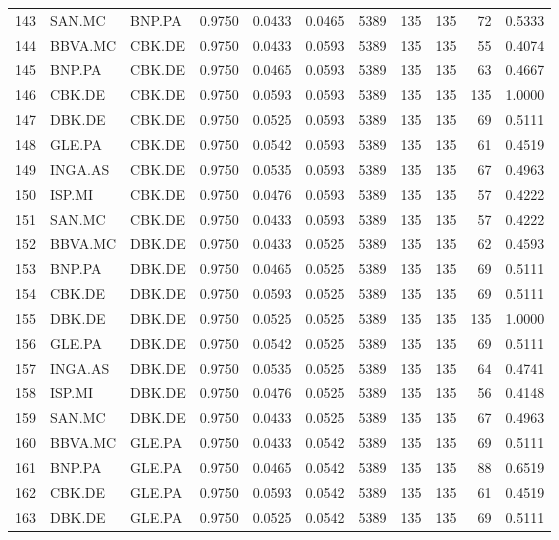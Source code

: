 \begin{table}
\begin{tabular}{lllrrrrrrrr}
143 & SAN.MC & BNP.PA & 0.9750 & 0.0433 & 0.0465 & 5389 & 135 & 135 & 72 & 0.5333 \\
144 & BBVA.MC & CBK.DE & 0.9750 & 0.0433 & 0.0593 & 5389 & 135 & 135 & 55 & 0.4074 \\
145 & BNP.PA & CBK.DE & 0.9750 & 0.0465 & 0.0593 & 5389 & 135 & 135 & 63 & 0.4667 \\
146 & CBK.DE & CBK.DE & 0.9750 & 0.0593 & 0.0593 & 5389 & 135 & 135 & 135 & 1.0000 \\
147 & DBK.DE & CBK.DE & 0.9750 & 0.0525 & 0.0593 & 5389 & 135 & 135 & 69 & 0.5111 \\
148 & GLE.PA & CBK.DE & 0.9750 & 0.0542 & 0.0593 & 5389 & 135 & 135 & 61 & 0.4519 \\
149 & INGA.AS & CBK.DE & 0.9750 & 0.0535 & 0.0593 & 5389 & 135 & 135 & 67 & 0.4963 \\
150 & ISP.MI & CBK.DE & 0.9750 & 0.0476 & 0.0593 & 5389 & 135 & 135 & 57 & 0.4222 \\
151 & SAN.MC & CBK.DE & 0.9750 & 0.0433 & 0.0593 & 5389 & 135 & 135 & 57 & 0.4222 \\
152 & BBVA.MC & DBK.DE & 0.9750 & 0.0433 & 0.0525 & 5389 & 135 & 135 & 62 & 0.4593 \\
153 & BNP.PA & DBK.DE & 0.9750 & 0.0465 & 0.0525 & 5389 & 135 & 135 & 69 & 0.5111 \\
154 & CBK.DE & DBK.DE & 0.9750 & 0.0593 & 0.0525 & 5389 & 135 & 135 & 69 & 0.5111 \\
155 & DBK.DE & DBK.DE & 0.9750 & 0.0525 & 0.0525 & 5389 & 135 & 135 & 135 & 1.0000 \\
156 & GLE.PA & DBK.DE & 0.9750 & 0.0542 & 0.0525 & 5389 & 135 & 135 & 69 & 0.5111 \\
157 & INGA.AS & DBK.DE & 0.9750 & 0.0535 & 0.0525 & 5389 & 135 & 135 & 64 & 0.4741 \\
158 & ISP.MI & DBK.DE & 0.9750 & 0.0476 & 0.0525 & 5389 & 135 & 135 & 56 & 0.4148 \\
159 & SAN.MC & DBK.DE & 0.9750 & 0.0433 & 0.0525 & 5389 & 135 & 135 & 67 & 0.4963 \\
160 & BBVA.MC & GLE.PA & 0.9750 & 0.0433 & 0.0542 & 5389 & 135 & 135 & 69 & 0.5111 \\
161 & BNP.PA & GLE.PA & 0.9750 & 0.0465 & 0.0542 & 5389 & 135 & 135 & 88 & 0.6519 \\
162 & CBK.DE & GLE.PA & 0.9750 & 0.0593 & 0.0542 & 5389 & 135 & 135 & 61 & 0.4519 \\
163 & DBK.DE & GLE.PA & 0.9750 & 0.0525 & 0.0542 & 5389 & 135 & 135 & 69 & 0.5111 \\

\end{tabular}
\end{table}
